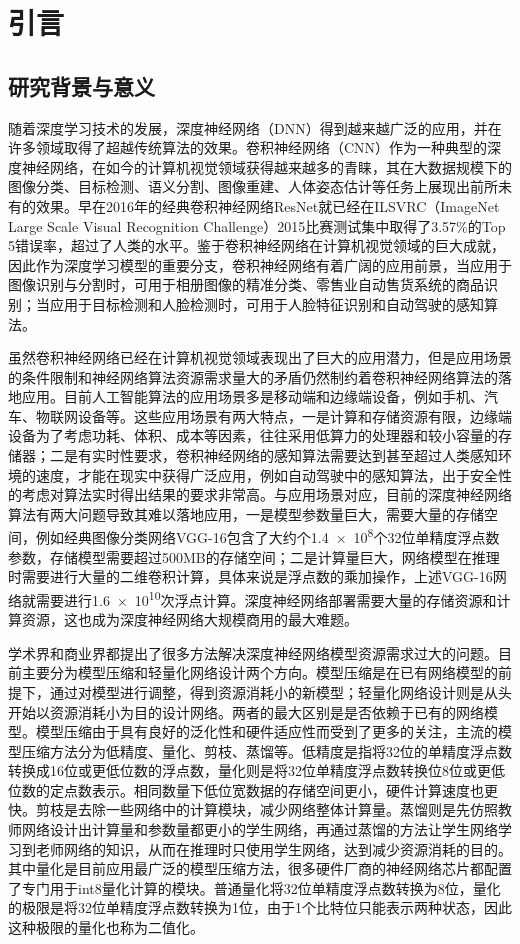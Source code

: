 
\chapter{引言}

\section{研究背景与意义}

随着深度学习技术的发展，深度神经网络（DNN）得到越来越广泛的应用，并在许多领域取得了超越传统算法的效果。卷积神经网络（CNN）作为一种典型的深度神经网络，在如今的计算机视觉领域获得越来越多的青睐，其在大数据规模下的图像分类、目标检测、语义分割、图像重建、人体姿态估计等任务上展现出前所未有的效果。早在2016年的经典卷积神经网络ResNet\citep{resnet}就已经在ILSVRC（ImageNet Large Scale Visual Recognition Challenge）2015比赛测试集中取得了3.57\%的Top 5错误率，超过了人类的水平。鉴于卷积神经网络在计算机视觉领域的巨大成就，因此作为深度学习模型的重要分支，卷积神经网络有着广阔的应用前景，当应用于图像识别与分割时，可用于相册图像的精准分类、零售业自动售货系统的商品识别；当应用于目标检测和人脸检测时，可用于人脸特征识别和自动驾驶的感知算法。

虽然卷积神经网络已经在计算机视觉领域表现出了巨大的应用潜力，但是应用场景的条件限制和神经网络算法资源需求量大的矛盾仍然制约着卷积神经网络算法的落地应用。目前人工智能算法的应用场景多是移动端和边缘端设备，例如手机、汽车、物联网设备等。这些应用场景有两大特点，一是计算和存储资源有限，边缘端设备为了考虑功耗、体积、成本等因素，往往采用低算力的处理器和较小容量的存储器；二是有实时性要求，卷积神经网络的感知算法需要达到甚至超过人类感知环境的速度，才能在现实中获得广泛应用，例如自动驾驶中的感知算法，出于安全性的考虑对算法实时得出结果的要求非常高。与应用场景对应，目前的深度神经网络算法有两大问题导致其难以落地应用，一是模型参数量巨大，需要大量的存储空间，例如经典图像分类网络VGG-16\citep{vgg}包含了大约个\num{1.4e8}个32位单精度浮点数参数，存储模型需要超过500MB的存储空间；二是计算量巨大，网络模型在推理时需要进行大量的二维卷积计算，具体来说是浮点数的乘加操作，上述VGG-16网络就需要进行\num{1.6e10}次浮点计算。深度神经网络部署需要大量的存储资源和计算资源，这也成为深度神经网络大规模商用的最大难题。

学术界和商业界都提出了很多方法解决深度神经网络模型资源需求过大的问题。目前主要分为模型压缩和轻量化网络设计两个方向。模型压缩是在已有网络模型的前提下，通过对模型进行调整，得到资源消耗小的新模型；轻量化网络设计则是从头开始以资源消耗小为目的设计网络。两者的最大区别是是否依赖于已有的网络模型。模型压缩由于具有良好的泛化性和硬件适应性而受到了更多的关注，主流的模型压缩方法分为低精度、量化、剪枝、蒸馏等。低精度是指将32位的单精度浮点数转换成16位或更低位数的浮点数，量化则是将32位单精度浮点数转换位8位或更低位数的定点数表示。相同数量下低位宽数据的存储空间更小，硬件计算速度也更快。剪枝是去除一些网络中的计算模块，减少网络整体计算量。蒸馏则是先仿照教师网络设计出计算量和参数量都更小的学生网络，再通过蒸馏的方法让学生网络学习到老师网络的知识，从而在推理时只使用学生网络，达到减少资源消耗的目的。其中量化是目前应用最广泛的模型压缩方法，很多硬件厂商的神经网络芯片都配置了专门用于int8量化计算的模块。普通量化将32位单精度浮点数转换为8位，量化的极限是将32位单精度浮点数转换为1位，由于1个比特位只能表示两种状态，因此这种极限的量化也称为二值化。

